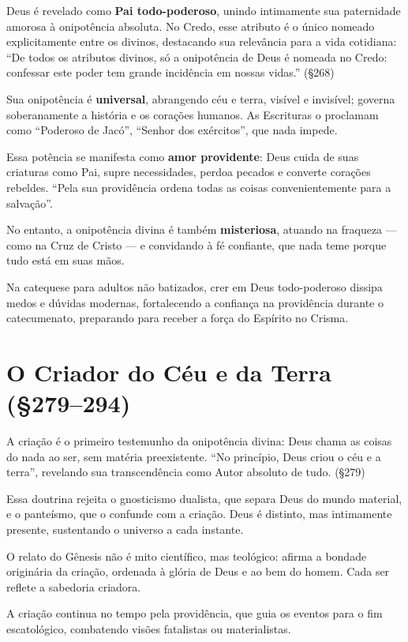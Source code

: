 Deus é revelado como \textbf{Pai todo-poderoso}, unindo intimamente sua paternidade amorosa à onipotência absoluta. No Credo, esse atributo é o único nomeado explicitamente entre os divinos, destacando sua relevância para a vida cotidiana: ``De todos os atributos divinos, só a onipotência de Deus é nomeada no Credo: confessar este poder tem grande incidência em nossas vidas.'' (\S 268)

Sua onipotência é \textbf{universal}, abrangendo céu e terra, visível e invisível; governa soberanamente a história e os corações humanos. As Escrituras o proclamam como ``Poderoso de Jacó'', ``Senhor dos exércitos'', que nada impede.

Essa potência se manifesta como \textbf{amor providente}: Deus cuida de suas criaturas como Pai, supre necessidades, perdoa pecados e converte corações rebeldes. ``Pela sua providência ordena todas as coisas convenientemente para a salvação''.

No entanto, a onipotência divina é também \textbf{misteriosa}, atuando na fraqueza --- como na Cruz de Cristo --- e convidando à fé confiante, que nada teme porque tudo está em suas mãos.

Na catequese para adultos não batizados, crer em Deus todo-poderoso dissipa medos e dúvidas modernas, fortalecendo a confiança na providência durante o catecumenato, preparando para receber a força do Espírito no Crisma.

\section{O Criador do Céu e da Terra (\S 279--294)}

A criação é o primeiro testemunho da onipotência divina: Deus chama as coisas do nada ao ser, sem matéria preexistente. ``No princípio, Deus criou o céu e a terra'', revelando sua transcendência como Autor absoluto de tudo. (\S 279)

Essa doutrina rejeita o gnosticismo dualista, que separa Deus do mundo material, e o panteísmo, que o confunde com a criação. Deus é distinto, mas intimamente presente, sustentando o universo a cada instante.

O relato do Gênesis não é mito científico, mas teológico: afirma a bondade originária da criação, ordenada à glória de Deus e ao bem do homem. Cada ser reflete a sabedoria criadora.

A criação continua no tempo pela providência, que guia os eventos para o fim escatológico, combatendo visões fatalistas ou materialistas.

